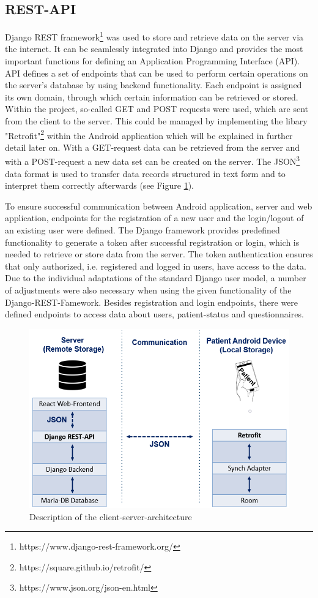 \subsection{REST-API}
Django REST framework\footnote{https://www.django-rest-framework.org/} was used to store and retrieve data on the server via the internet. It can be seamlessly integrated into Django and provides the most important functions for defining an Application Programming Interface (API). API defines a set of endpoints that can be used to perform certain operations on the server's database by using backend functionality. Each endpoint is assigned its own domain, through which certain information can be retrieved or stored. Within the project, so-called GET and POST requests were used, which are sent from the client to the server.  This could be managed by implementing the libary "Retrofit"\footnote{https://square.github.io/retrofit/} within the Android application which will be explained in further detail later on. With a GET-request data can be retrieved from the server and with a POST-request a new data set can be created on the server. The JSON\footnote{https://www.json.org/json-en.html} data format is used to transfer data records structured in text form and to interpret them correctly afterwards (see Figure \ref{fig:ClientServer}). 

To ensure successful communication between Android application, server and web application, endpoints for the registration of a new user and the login/logout of an existing user were defined. The Django framework provides predefined functionality to generate a token after successful registration or login, which is needed to retrieve or store data from the server.
The token authentication ensures that only authorized, i.e. registered and logged in users, have access to the data. Due to the individual adaptations of the standard Django user model, a number of adjustments were also necessary when using the given functionality of the Django-REST-Famework. Besides registration and login endpoints, there were defined endpoints to access data about users, patient-status and questionnaires.

\begin{figure}[h]
    \centering
    \includegraphics[width = \textwidth]{figures/Client-Server-Architecture.png}
    \caption[Database schema]{Description of the client-server-architecture}
    \label{fig:ClientServer}
\end{figure}